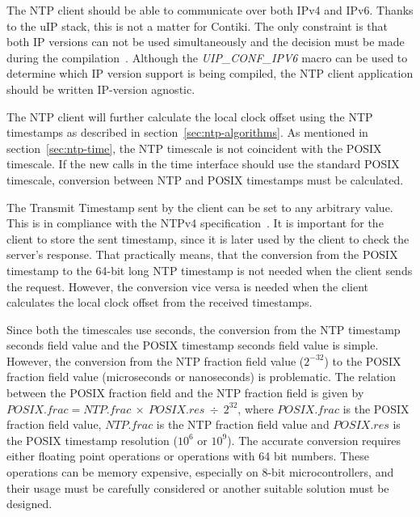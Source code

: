 The NTP client should be able to communicate over both IPv4 and IPv6.
Thanks to the uIP stack, this is not a matter for Contiki.
The only constraint is that both IP versions can not be used simultaneously
and the decision must be made during the compilation~\cite{contiki-docs}.
Although the {\it{UIP\_CONF\_IPV6}} macro can be used to determine which IP version
support is being compiled, the NTP client application should be written IP-version agnostic.

The NTP client will further calculate the local clock offset using the NTP timestamps
as described in section~\ref{sec:ntp-algorithms}.
As mentioned in section~\ref{sec:ntp-time}, the NTP timescale is not
coincident with the POSIX timescale.
If the new calls in the time interface should use the standard POSIX timescale,
conversion between NTP and POSIX timestamps must be calculated.

The Transmit Timestamp sent by the client can be set to any arbitrary value.
This is in compliance with the NTPv4 specification~\cite{rfc5905}.
It is important for the client to store the sent timestamp,
since it is later used by the client to check the server's response.
That practically means, that the conversion from the POSIX timestamp to the 64-bit long NTP timestamp
is not needed when the client sends the request.
However, the conversion vice versa is needed when the client calculates
the local clock offset from the received timestamps.

Since both the timescales use seconds, the conversion from
the NTP timestamp seconds field value and the POSIX timestamp seconds field value is simple.
However, the conversion from the NTP fraction field value ($2^{-32}$)
to the POSIX fraction field value (microseconds or nanoseconds) is problematic.
The relation between the POSIX fraction field and the NTP fraction field
is given by $POSIX.frac = NTP.frac~\times~POSIX.res~\div~2^{32}$,
where $POSIX.frac$ is the POSIX fraction field value,
$NTP.frac$ is the NTP fraction field value and
$POSIX.res$ is the POSIX timestamp resolution ($10^6$ or $10^9$).
The accurate conversion requires either floating point operations or operations with 64 bit numbers.
These operations can be memory expensive, especially on 8-bit microcontrollers,
and their usage must be carefully considered or another suitable solution must be designed.
